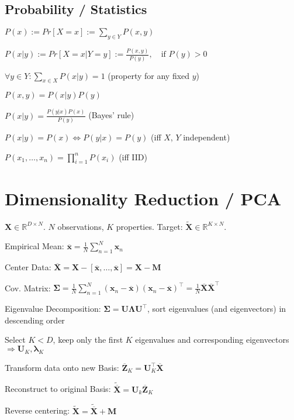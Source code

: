 \documentclass[a4paper, 11pt, landscape]{article}
\begin{document}
\begin{multicols*}{3}
\subsection{Probability / Statistics}
\begin{inparaitem}[\color{red}\textbullet]
	\item $P(x) := Pr[X = x] := \sum_{y \in Y} P(x, y)$
	\item $P(x|y) := Pr[X = x | Y = y] := \frac{P(x,y)}{P(y)},\quad \text{if } P(y) > 0$
	\item $\forall y \in Y: \sum_{x \in X} P(x|y) = 1$ (property for any fixed $y$)
	\item $P(x, y) = P(x|y) P(y)$
	\item $P(x|y) = \frac{P(y|x)P(x)}{P(y)}$ (Bayes' rule)
	\item $P(x|y) = P(x) \Leftrightarrow P(y|x) = P(y)$ (iff $X$, $Y$ independent)
	\item $P(x_1, \ldots, x_n) = \prod_{i=1}^n P(x_i)$ (iff IID)
\end{inparaitem}


\section{Dimensionality Reduction / PCA}
$\mathbf{X} \in \mathbb{R}^{D \times N}$. $N$ observations, $K$ properties. Target: $\tilde{\mathbf{X}} \in \mathbb{R}^{K \times N}$.
\begin{inparaenum}
	\item Empirical Mean: $\overline{\mathbf{x}} = \frac{1}{N} \sum_{n=1}^N \mathbf{x}_n$
	\item Center Data: $\overline{\mathbf{X}} = \mathbf{X} - [\overline{\mathbf{x}}, \ldots, \overline{\mathbf{x}}] = \mathbf{X} - \mathbf{M}$
	\item Cov. Matrix: $\boldsymbol{\Sigma} = \frac{1}{N	} \sum_{n=1}^N (\mathbf{x}_n - \overline{\mathbf{x}}) (\mathbf{x}_n - \overline{\mathbf{x}})^\top = \frac{1}{N} \overline{\mathbf{X}}\overline{\mathbf{X}}^\top$
	\item Eigenvalue Decomposition: $\boldsymbol{\Sigma} = \mathbf{U} \boldsymbol{\Lambda} \mathbf{U}^\top$, sort eigenvalues (and eigenvectors) in descending order
	\item Select $K < D$, keep only the first $K$ eigenvalues and corresponding eigenvectors $\Rightarrow \mathbf{U}_K, \boldsymbol{\lambda}_K$
	\item Transform data onto new Basis: $\overline{\mathbf{Z}}_K = \mathbf{U}_K^\top \overline{\mathbf{X}}$
	\item Reconstruct to original Basis: $\tilde{\overline{\mathbf{X}}} = \mathbf{U}_k \overline{\mathbf{Z}}_K$
	\item Reverse centering: $\tilde{\mathbf{X}} = \tilde{\overline{\mathbf{X}}} + \mathbf{M}$
\end{inparaenum}


\end{multicols*}
\end{document}
